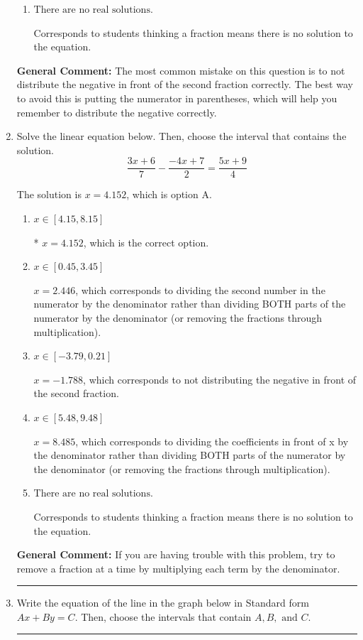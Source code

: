 \documentclass{extbook}[14pt]
\newcommand{\litem}[1]{\item #1

\rule{\textwidth}{0.4pt}}
\begin{document}
\begin{enumerate}
{\begin{enumerate}[label=\Alph*.]
$x = 0.229$, which corresponds to not distributing the negative in front of the second parentheses correctly.
\item \( \text{There are no real solutions.} \)

Corresponds to students thinking a fraction means there is no solution to the equation.
\end{enumerate}

\textbf{General Comment:} The most common mistake on this question is to not distribute the negative in front of the second fraction correctly. The best way to avoid this is putting the numerator in parentheses, which will help you remember to distribute the negative correctly.
}
\litem{
Solve the linear equation below. Then, choose the interval that contains the solution.
\[ \frac{3x + 6}{7} - \frac{-4x + 7}{2} = \frac{5x + 9}{4} \]

The solution is \( x = 4.152 \), which is option A.\begin{enumerate}[label=\Alph*.]
\item \( x \in [4.15, 8.15] \)

* $x = 4.152$, which is the correct option.
\item \( x \in [0.45, 3.45] \)

 $x = 2.446$, which corresponds to dividing the second number in the numerator by the denominator rather than dividing BOTH parts of the numerator by the denominator (or removing the fractions through multiplication).
\item \( x \in [-3.79, 0.21] \)

 $x = -1.788$, which corresponds to not distributing the negative in front of the second fraction.
\item \( x \in [5.48, 9.48] \)

 $x = 8.485$, which corresponds to dividing the coefficients in front of x by the denominator rather than dividing BOTH parts of the numerator by the denominator (or removing the fractions through multiplication).
\item \( \text{There are no real solutions.} \)

Corresponds to students thinking a fraction means there is no solution to the equation.
\end{enumerate}

\textbf{General Comment:} If you are having trouble with this problem, try to remove a fraction at a time by multiplying each term by the denominator.
}
\litem{
Write the equation of the line in the graph below in Standard form $Ax+By=C$. Then, choose the intervals that contain $A, B, \text{ and } C$.

}
\end{enumerate}
\end{document}
